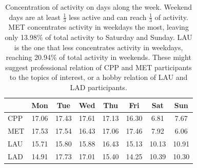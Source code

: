 \documentclass[%
 aip,
 jmp,%
 amsmath,amssymb,
 reprint,%
]{revtex4-1}
\begin{document}
\begin{table}[h]
    \caption{Concentration of activity on days along the week. Weekend days are at least $\frac{1}{3}$ less active and can reach $\frac{1}{3}$ of activity. MET concentrates activity in weekdays the most, leaving only 13.98\% of total activity to Saturday and Sunday. LAU is the one that less concentrates activity in weekdays, reaching 20.94\% of total activity in weekends. These might suggest professional relation of CPP and MET participants to the topics of interest, or a hobby relation of LAU and LAD participants.}
\begin{center}
    \begin{tabular}{ | l |  c | c | c | c | c |   c | c |}
        \hline
        & Mon & Tue & Wed & Thu & Fri & Sat & Sun  \\ \hline
        CPP & 17.06 & 17.43 & 17.61 & 17.13 & 16.30 & 6.81 & 7.67 \\ \hline
        MET & 17.53 & 17.54 & 16.43 & 17.06 & 17.46 & 7.92 & 6.06 \\ \hline
        LAU & 15.71 & 15.80 & 15.88 & 16.43 & 15.13 & 10.13 & 10.91 \\ \hline
        LAD & 14.91 & 17.73 & 17.01 & 15.40 & 14.25 & 10.39 & 10.30 \\\hline
    \end{tabular}
\end{center}
\label{semana}
\end{table}
\end{document}
